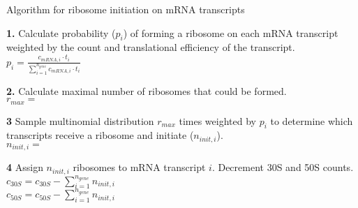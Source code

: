 \documentclass[12pt]{article}
\begin{document}
    
\begin{algorithm}[H]
\caption{Algorithm for ribosome initiation on mRNA transcripts}
\label{polypeptide_initiation_algorithm}

    
  \textbf{1.} Calculate probability ($p_i$) of forming a ribosome on each mRNA transcript weighted by the count and translational efficiency of the transcript.\\
    \-\hspace{1cm} $p_i = \frac{c_{mRNA,i} \cdot t_i}{\sum\limits^{n_{gene}}_{i=1} c_{mRNA,i} \cdot t_i}$
    
    \textbf{2.} Calculate maximal number of ribosomes that could be formed.\\
    \-\hspace{1cm} $r_{max} =$ 
    
    \textbf{3} Sample multinomial distribution $r_{max}$ times weighted by $p_i$ to determine which transcripts receive a ribosome and initiate ($n_{init,i}$).\\
    \-\hspace{1cm} $n_{init,i} =$ 
    
    \textbf{4} Assign $n_{init,i}$ ribosomes to mRNA transcript $i$. Decrement 30S and 50S counts.\\
    \-\hspace{1cm} $c_{30S} = c_{30S} - \sum\limits^{n_{gene}}_{i=1} n_{init,i}$\\
    \-\hspace{1cm} $c_{50S} = c_{50S} - \sum\limits^{n_{gene}}_{i=1} n_{init,i}$\\

\end{algorithm}
\newpage
\end{document}
